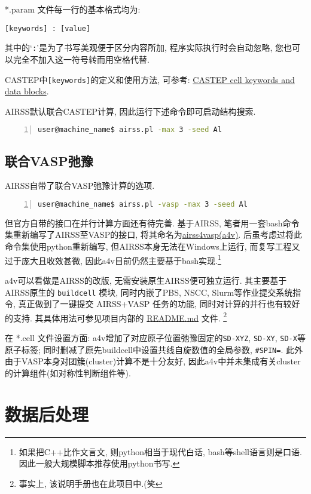 \documentclass[a4paper, 10pt]{article}
\begin{document}
*.param 文件每一行的基本格式均为:
\begin{lstlisting}
[keywords] : [value]
\end{lstlisting}
其中的`\verb|:|'是为了书写美观便于区分内容所加, 程序实际执行时会自动忽略, 您也可以完全不加入这一符号转而用空格代替.

CASTEP中\verb|[keywords]|的定义和使用方法, 可参考: \href{http://www.tcm.phy.cam.ac.uk/castep/documentation/WebHelp/content/modules/castep/keywords/k_main_structure.htm}{CASTEP cell keywords and data blocks}.

AIRSS默认联合CASTEP计算, 因此运行下述命令即可启动结构搜索.
\begin{lstlisting}[language={bash},numbers=left]
user@machine_name$ airss.pl -max 3 -seed Al
\end{lstlisting}

\subsection{联合VASP弛豫}
AIRSS自带了联合VASP弛豫计算的选项. 
\begin{lstlisting}[language={bash},numbers=left]
user@machine_name$ airss.pl -vasp -max 3 -seed Al
\end{lstlisting}

但官方自带的接口在并行计算方面还有待完善. 基于AIRSS, 笔者用一套bash命令集重新编写了AIRSS至VASP的接口, 将其命名为\href{https://github.com/kYangLi/airss4vasp}{airss4vasp(a4v)}. 后虽考虑过将此命令集使用python重新编写, 但AIRSS本身无法在Windows上运行, 而复写工程又过于庞大且收效甚微, 因此a4v目前仍然主要基于bash实现.\footnote{如果把C++比作文言文, 则python相当于现代白话, bash等shell语言则是口语. 因此一般大规模脚本推荐使用python书写.}

a4v可以看做是AIRSS的改版, 无需安装原生AIRSS便可独立运行. 其主要基于AIRSS原生的 \verb|buildcell| 模块, 同时内嵌了PBS, NSCC, Slurm等作业提交系统指令, 真正做到了一键提交 AIRSS+VASP 任务的功能, 同时对计算的并行也有较好的支持. 其具体用法可参见项目内部的 \href{https://github.com/kYangLi/airss4vasp/blob/master/README.md}{README.md} 文件. \footnote{事实上, 该说明手册也在此项目中.(笑} 

在 *.cell 文件设置方面: a4v增加了对应原子位置弛豫固定的\verb|SD-XYZ|, \verb|SD-XY|, \verb|SD-X|等原子标签; 同时删减了原先buildcell中设置共线自旋数值的全局参数, \verb|#SPIN=|. 此外由于VASP本身对团簇(cluster)计算不是十分友好, 因此a4v中并未集成有关cluster的计算组件(如对称性判断组件等).

\newpage
\section{数据后处理}
\end{document}
